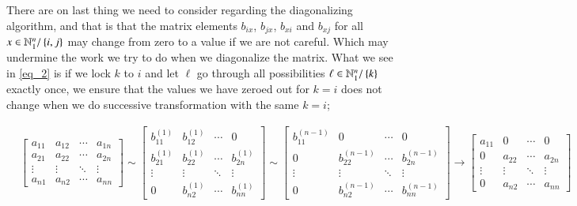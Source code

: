 \documentclass[11pt,english,a4paper]{article}
\begin{document}
\begin{flushleft}
There are on last thing we need to consider regarding the diagonalizing algorithm, and that is that the matrix elements $b_{ix}$, $b_{jx}$, $b_{xi}$ and $b_{xj}$ for all $x\in\mathbb{N}_1^n / \left\lbrace{i,j}\right\rbrace$ may change from zero to a value if we are not careful. Which may undermine the work we try to do when we diagonalize the matrix. What we see in \eqref{eq_2} is if we lock $k$ to $i$ and let $\ell$ go through all possibilities $\ell\in\mathbb{N}_1^n / \left\lbrace{k}\right\rbrace$ exactly once, we ensure that the values we have zeroed out for $k=i$ does not change when we do successive transformation with the same $k=i$;

\begin{align*}
&\begin{bmatrix} a_{11} & a_{12} & \cdots & a_{1n} \\ a_{21} & a_{22} & \cdots & a_{2n} \\ \vdots & \vdots & \ddots & \vdots \\ a_{n1} & a_{n2} & \cdots & a_{nn} \end{bmatrix} 
\sim \begin{bmatrix} b_{11}^{(1)} & b_{12}^{(1)} & \cdots & 0 \\ b_{21}^{(1)} & b_{22}^{(1)} & \cdots & b_{2n}^{(1)} \\ \vdots & \vdots & \ddots & \vdots \\ 0 & b_{n2}^{(1)} & \cdots & b_{nn}^{(1)} \end{bmatrix}
\sim \begin{bmatrix} b_{11}^{(n-1)} & 0 & \cdots & 0 \\ 0 & b_{22}^{(n-1)} & \cdots & b_{2n}^{(n-1)} \\ \vdots & \vdots & \ddots & \vdots \\ 0 & b_{n2}^{(n-1)} & \cdots & b_{nn}^{(n-1)} \end{bmatrix} \to \begin{bmatrix} a_{11} & 0 & \cdots & 0 \\ 0 & a_{22} & \cdots & a_{2n} \\ \vdots & \vdots & \ddots & \vdots \\ 0 & a_{n2} & \cdots & a_{nn} \end{bmatrix} 
\end{align*} 


\end{flushleft}
\end{document}
